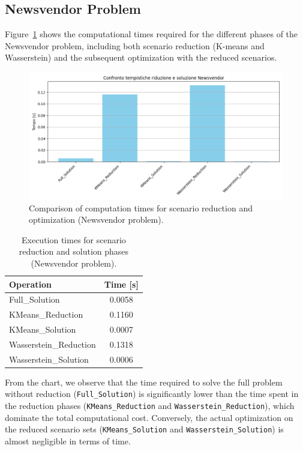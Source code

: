 \documentclass[a4paper,12pt]{article}
\begin{document}
	\subsection{Newsvendor Problem}
	
	Figure~\ref{fig:timing-nv} shows the computational times required for the different phases of the Newsvendor problem, including both scenario reduction (K-means and Wasserstein) and the subsequent optimization with the reduced scenarios.
	
	\begin{figure}[htbp]
		\centering
		\includegraphics[width=1\textwidth]{../immagini/tempiNV.png}
		\caption{Comparison of computation times for scenario reduction and optimization (Newsvendor problem).}
		\label{fig:timing-nv}
	\end{figure}
	
	\begin{table}[htbp]
		\centering
		\caption{Execution times for scenario reduction and solution phases (Newsvendor problem).}
		\begin{tabular}{lc}
			\hline
			\textbf{Operation} & \textbf{Time [s]} \\
			\hline
			Full\_Solution         & 0.0058 \\
			KMeans\_Reduction      & 0.1160 \\
			KMeans\_Solution       & 0.0007 \\
			Wasserstein\_Reduction & 0.1318 \\
			Wasserstein\_Solution  & 0.0006 \\
			\hline
		\end{tabular}
		\label{tab:timing-nv}
	\end{table}
	
	
	
	From the chart, we observe that the time required to solve the full problem without reduction (\texttt{Full\_Solution}) is significantly lower than the time spent in the reduction phases (\texttt{KMeans\_Reduction} and \texttt{Wasserstein\_Reduction}), which dominate the total computational cost. Conversely, the actual optimization on the reduced scenario sets (\texttt{KMeans\_Solution} and \texttt{Wasserstein\_Solution}) is almost negligible in terms of time. 
	
\end{document}
